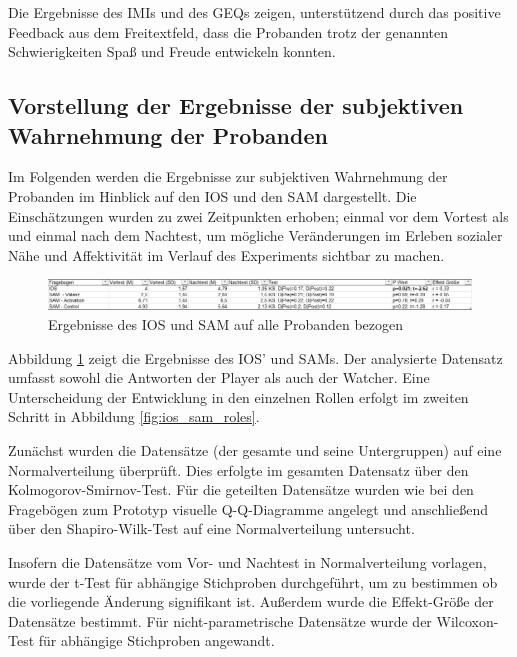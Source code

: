 Die Ergebnisse des \ac{IMI}s und des \ac{GEQ}s zeigen, unterstützend durch das positive Feedback aus dem Freitextfeld, dass die Probanden trotz der genannten Schwierigkeiten Spaß und Freude entwickeln konnten.

\subsection{Vorstellung der Ergebnisse der subjektiven Wahrnehmung der Probanden}
Im Folgenden werden die Ergebnisse zur subjektiven Wahrnehmung der Probanden im Hinblick auf den \ac{IOS} und den \ac{SAM} dargestellt. Die Einschätzungen wurden zu zwei Zeitpunkten erhoben; einmal vor dem Vortest als  und einmal nach dem Nachtest, um mögliche Veränderungen im Erleben sozialer Nähe und Affektivität im Verlauf des Experiments sichtbar zu machen.

\begin{figure}[ht]
\centering
\includegraphics[width=1\linewidth]{content/pictures/IOS_SAM_Overal.png}
\caption{Ergebnisse des \ac{IOS} und \ac{SAM} auf alle Probanden bezogen}
\label{fig:ios_sam_overal}
\end{figure}

Abbildung \ref{fig:ios_sam_overal} zeigt die Ergebnisse des \ac{IOS}' und \ac{SAM}s. Der analysierte Datensatz umfasst sowohl die Antworten der Player als auch der Watcher. Eine Unterscheidung der Entwicklung in den einzelnen Rollen erfolgt im zweiten Schritt in Abbildung \ref{fig:ios_sam_roles}.

Zunächst wurden die Datensätze (der gesamte und seine Untergruppen) auf eine Normalverteilung überprüft. Dies erfolgte im gesamten Datensatz über den  Kolmogorov-Smirnov-Test. %
Für die geteilten Datensätze wurden wie bei den Fragebögen zum Prototyp visuelle \ac{Q-Q}-Diagramme angelegt und anschließend über den Shapiro-Wilk-Test auf eine Normalverteilung untersucht.

Insofern die Datensätze vom Vor- und Nachtest in Normalverteilung vorlagen, wurde der t-Test für abhängige Stichproben durchgeführt, um zu bestimmen ob die vorliegende Änderung signifikant ist. Außerdem wurde die Effekt-Größe der Datensätze bestimmt. Für nicht-parametrische Datensätze wurde der Wilcoxon-Test für abhängige Stichproben angewandt.

